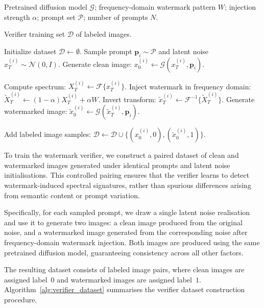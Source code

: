 \begin{algorithm}[t]
\caption{{\color{blue}Verifier Training Dataset Construction}}
\label{alg:verifier_dataset}
\begin{algorithmic}[1]
\Require
Pretrained diffusion model $\mathcal{G}$;
frequency-domain watermark pattern $W$;
injection strength $\alpha$;
prompt set $\mathcal{P}$;
number of prompts $N$.

\Ensure
Verifier training set $\mathcal{D}$ of labeled images.

\State Initialize dataset $\mathcal{D} \leftarrow \emptyset$.
    \State Sample prompt $\mathbf{p}_i \sim \mathcal{P}$ and latent noise $x_T^{(i)} \sim \mathcal{N}(0,I)$.
    \State Generate clean image: $x_0^{(i)} \leftarrow \mathcal{G}(x_T^{(i)}, \mathbf{p}_i)$.

    \State Compute spectrum: $X_T^{(i)} \leftarrow \mathcal{F}\{x_T^{(i)}\}$.
    \State Inject watermark in frequency domain:
    \State \hspace{1.2em} $\tilde{X}_T^{(i)} \leftarrow (1-\alpha)X_T^{(i)} + \alpha W$.
    \State Invert transform: $\tilde{x}_T^{(i)} \leftarrow \mathcal{F}^{-1}\{\tilde{X}_T^{(i)}\}$.
    \State Generate watermarked image: $\tilde{x}_0^{(i)} \leftarrow \mathcal{G}(\tilde{x}_T^{(i)}, \mathbf{p}_i)$.

    \State Add labeled image samples:
    \State \hspace{1.2em} $\mathcal{D} \leftarrow \mathcal{D} \cup \{(x_0^{(i)},0), (\tilde{x}_0^{(i)},1)\}$.
\EndFor
\end{algorithmic}
\end{algorithm}

To train the watermark verifier, we construct a paired dataset of clean and watermarked images generated under identical prompts and latent noise initialisations. 
This controlled pairing ensures that the verifier learns to detect watermark-induced spectral signatures, rather than spurious differences arising from semantic content or prompt variation.

Specifically, for each sampled prompt, we draw a single latent noise realisation and use it to generate two images: a clean image produced from the original noise, and a watermarked image generated from the corresponding noise after frequency-domain watermark injection. 
Both images are produced using the same pretrained diffusion model, guaranteeing consistency across all other factors.

The resulting dataset consists of labeled image pairs, where clean images are assigned label~$0$ and watermarked images are assigned label~$1$. Algorithm~\ref{alg:verifier_dataset} summarises the verifier dataset construction procedure.


